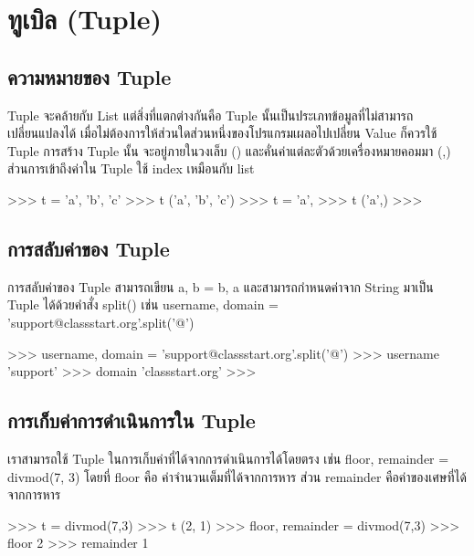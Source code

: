\chapter{ทูเบิล (Tuple)}
\section{ความหมายของ Tuple}

Tuple จะคล้ายกับ List แต่สิ่งที่แตกต่างกันคือ Tuple นั้นเป็นประเภทข้อมูลที่ไม่สามารถเปลี่ยนแปลงได้ เมื่อไม่ต้องการให้ส่วนใดส่วนหนึ่งของโปรแกรมเผลอไปเปลี่ยน Value ก็ควรใช้ Tuple การสร้าง Tuple นั้น จะอยู่ภายในวงเล็บ () และคั่นค่าแต่ละตัวด้วยเครื่องหมายคอมมา (,) ส่วนการเข้าถึงค่าใน Tuple ใช้ index เหมือนกับ list

\begin{codelist}{}{}
>>> t = 'a', 'b', 'c'
>>> t
('a', 'b', 'c')
>>> t = 'a',
>>> t
('a',)
>>>
\end{codelist}



\section{การสลับค่าของ Tuple}

การสลับค่าของ Tuple สามารถเขียน a, b = b, a และสามารถกำหนดค่าจาก String มาเป็น Tuple ได้ด้วยคำสั่ง split() เช่น username, domain = 'support@classstart.org'.split('@')

\begin{codelist}{}{}
>>> username, domain = 'support@classstart.org'.split('@')
>>> username
'support'
>>> domain
'classstart.org'
>>>
\end{codelist}


\section{การเก็บค่าการดำเนินการใน Tuple}

เราสามารถใช้ Tuple ในการเก็บค่าที่ได้จากการดำเนินการได้โดยตรง เช่น  floor, remainder = divmod(7, 3) โดยที่ floor คือ ค่าจำนวนเต็มที่ได้จากการหาร ส่วน remainder คือค่าของเศษที่ได้จากการหาร

\begin{codelist}{}{}
>>> t = divmod(7,3)
>>> t
(2, 1)
>>> floor, remainder = divmod(7,3)
>>> floor
2
>>> remainder
1
\end{codelist}


